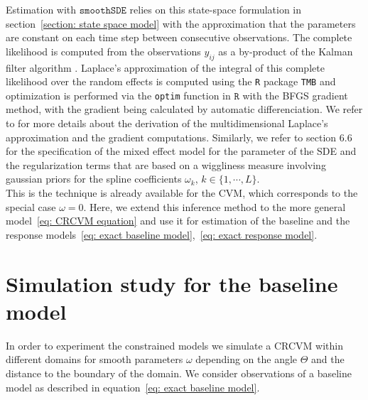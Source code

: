 \documentclass[11pt]{article}
\newcommand {\1}{\mathbb{1}}
\theoremstyle{definition}
\theoremstyle{remark}
\theoremstyle{remark}
\begin{document}
Estimation with $\texttt{smoothSDE}$ relies on this state-space formulation in section~\ref{section: state space model} with the approximation that the parameters are constant on each time step between consecutive observations.
The complete likelihood is computed from the observations $y_{ij}$ as a by-product of the Kalman filter algorithm \cite{michelot_varying-coefficient_2021}.
Laplace's approximation of the integral of this complete likelihood over the random effects is computed using the \texttt{R} package \texttt{TMB}  and optimization is performed via the \texttt{optim} function in $\texttt{R}$ with the BFGS gradient method, with the gradient being calculated by automatic differenciation. We refer to \cite{kristensen_tmb_2016} for more details about the derivation of the multidimensional Laplace's approximation and the gradient computations. Similarly, we refer to \cite{wood_generalized_2017} section $6.6$ for the specification of the mixed effect model for the parameter of the SDE and the regularization terms that are based on a wiggliness measure involving gaussian priors for the spline coefficients $\omega_k$, $k \in \{1,\cdots,L\}$. \\
This is the technique is already available for the CVM, which corresponds to the special case $\omega=0$. Here, we extend this inference method to the more general model~\ref{eq: CRCVM equation} and use it for estimation of the baseline and the response models~\ref{eq: exact baseline model},~\ref{eq: exact response model}.




\section{Simulation study for the baseline model}
\label{section: simulation constrained motion}
In order to experiment the constrained models we simulate a CRCVM within different domains for smooth parameters $\omega$ depending on the angle $\Theta$ and the distance to the boundary of the domain. We consider observations of a baseline model as described in equation~\ref{eq: exact baseline model}.\\
\end{document}
